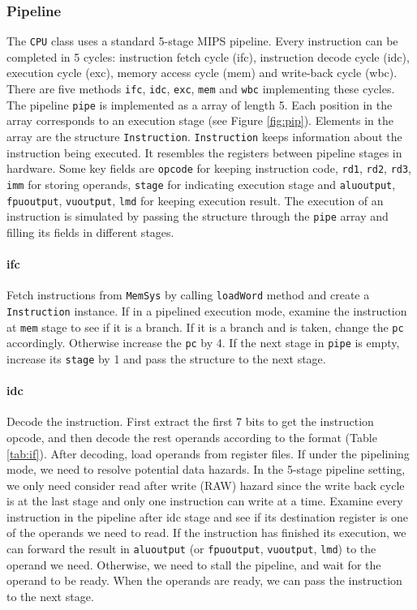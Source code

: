 \documentclass{sig-alternate}
\begin{document}
\subsubsection{Pipeline}
The \texttt{CPU} class uses a standard 5-stage MIPS pipeline. Every instruction can be completed in 5 cycles: instruction fetch cycle (ifc), instruction decode cycle (idc), execution cycle (exc), memory access cycle (mem) and write-back cycle (wbc). There are five methods \texttt{ifc}, \texttt{idc}, \texttt{exc}, \texttt{mem} and \texttt{wbc} implementing these cycles. The pipeline \texttt{pipe} is implemented as a array of length 5. Each position in the array corresponds to an execution stage (see Figure \ref{fig:pip}). Elements in the array are the structure \texttt{Instruction}. \texttt{Instruction} keeps information about the instruction being executed. It resembles the registers between pipeline stages in hardware. Some key fields are \texttt{opcode} for keeping instruction code, \texttt{rd1}, \texttt{rd2}, \texttt{rd3}, \texttt{imm} for storing operands, \texttt{stage} for indicating execution stage and \texttt{aluoutput}, \texttt{fpuoutput}, \texttt{vuoutput}, \texttt{lmd} for keeping execution result. The execution of an instruction is simulated by passing the structure through the \texttt{pipe} array and filling its fields in different stages. 

\paragraph{ifc}
Fetch instructions from \texttt{MemSys} by calling \texttt{loadWord} method and create a \texttt{Instruction} instance. If in a pipelined execution mode, examine the instruction at \texttt{mem} stage to see if it is a branch. If it is a branch and is taken, change the \texttt{pc} accordingly. Otherwise increase the \texttt{pc} by 4. If the next stage in \texttt{pipe} is empty, increase its \texttt{stage} by 1 and pass the structure to the next stage.  

\paragraph{idc}
Decode the instruction. First extract the first 7 bits to get the instruction opcode, and then decode the rest operands according to the format (Table \ref{tab:if}). After decoding, load operands from register files. If under the pipelining mode, we need to resolve potential data hazards. In the 5-stage pipeline setting, we only need consider read after write (RAW) hazard since the write back cycle is at the last stage and only one instruction can write at a time. Examine every instruction in the pipeline after idc stage and see if its destination register is one of the operands we need to read. If the instruction has finished its execution, we can forward the result in \texttt{aluoutput} (or \texttt{fpuoutput}, \texttt{vuoutput}, \texttt{lmd}) to the operand we need. Otherwise, we need to stall the pipeline, and wait for the operand to be ready. When the operands are ready, we can pass the instruction to the next stage.
\end{document}
